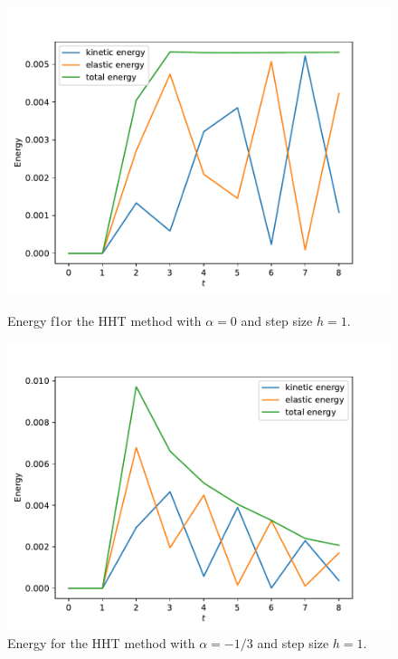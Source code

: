 \documentclass{report}
\begin{document}
\begin{figure}[h]
\centering
\begin{minipage}[t]{0.45\textwidth}
\centering
\includegraphics[width=\textwidth]{../Plots/Project3_main/Figure_900.pdf}
\caption{Energy f1or the HHT method with $\alpha=0$ and step size $h=1$.}
\label{pl:beam_exp_HHTalpha_0}
\end{minipage}
\hfill
\begin{minipage}[t]{0.45\textwidth}
\centering
\includegraphics[width=\textwidth]{../Plots/Project3_main/Figure_901.pdf}
\caption{Energy for the HHT method with $\alpha=-1/3$ and step size $h=1$.}
\label{pl:beam_exp_HHTalpha_minimal}
\end{minipage}
\end{figure}
\end{document}
